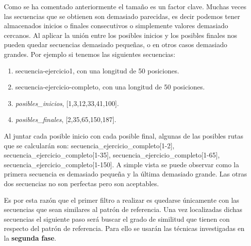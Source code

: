 Como se ha comentado anteriormente el tamaño es un factor clave. Muchas veces las secuencias que se obtienen son demasiado parecidas, es decir podemos tener almacenados inicios o finales consecutivos o simplemente valores demasiado cercanos. Al aplicar la unión entre los posibles inicios y los posibles finales nos pueden quedar secuencias demasiado pequeñas, o en otros casos demasiado grandes. Por ejemplo si tenemos las siguientes secuencias:
\begin{enumerate}
    \item \emph{}{secuencia-ejercicio1}, con una longitud de 50 posiciones.
    \item \emph{}{secuencia-ejercicio-completo}, con una longitud de 50 posiciones.    
    \item \emph{}{\textit{posibles\_inicios}}, [1,3,12,33,41,100].
    \item \emph{}{\textit{posibles\_finales}}, [2,35,65,150,187].
\end{enumerate}

Al juntar cada posible inicio con cada posible final, algunas de las posibles rutas que se calcularán son:
secuencia\_ejercicio\_completo[1-2], secuencia\_ejercicio\_completo[1-35], secuencia\_ejercicio\_completo[1-65],\\ secuencia\_ejercicio\_completo[1-150]. A simple vista se puede observar como la primera secuencia es demasiado pequeña y la última demasiado grande. Las otras dos secuencias no son perfectas pero son aceptables.

Es por esta razón que el primer filtro a realizar es quedarse únicamente con las secuencias que sean similares al patrón de referencia. Una vez localizadas dichas secuencias el siguiente paso será buscar el grado de similitud que tienen con respecto del patrón de referencia. Para ello se usarán las técnicas investigadas en la \textbf{segunda fase}. 

